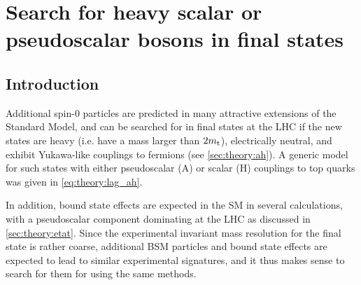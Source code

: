 \chapter{Search for heavy scalar or pseudoscalar bosons in \ttbartitle final states}
\label{ch:ah}

\section{Introduction}
\label{sec:ah:intro}

Additional spin-0 particles are predicted in many attractive extensions of the Standard Model, and can be searched for in \ttbar final states at the LHC if the new states are heavy (i.e. have a mass larger than $2m_{\mathrm{t}}$), electrically neutral, and exhibit Yukawa-like couplings to fermions (see \cref{sec:theory:ah}). A generic model for such states with either pseudoscalar (A) or scalar (H) couplings to top quarks was given in \cref{eq:theory:lag_ah}.

In addition, \ttbar bound state effects are expected in the SM in several calculations, with a pseudoscalar component dominating at the LHC as discussed in \cref{sec:theory:etat}. Since the experimental invariant mass resolution for the \ttbar final state is rather coarse, additional BSM particles and bound state effects are expected to lead to similar experimental signatures, and it thus makes sense to search for them for using the same methods.




